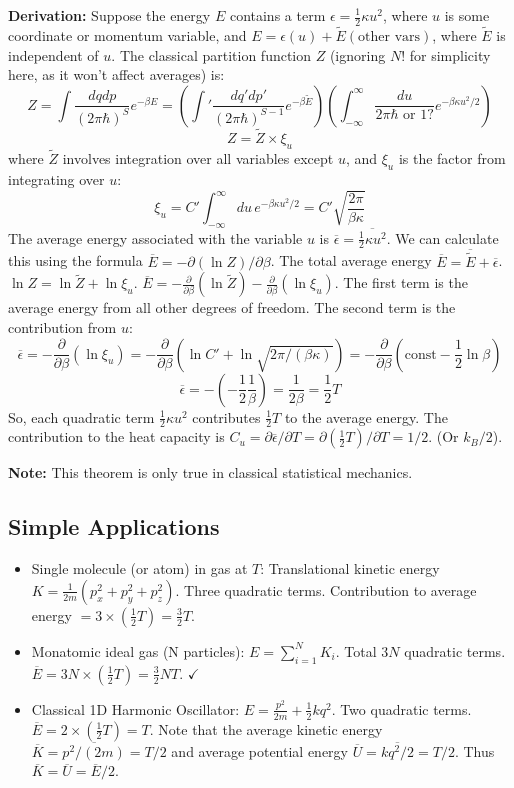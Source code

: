 \documentclass[11pt]{article}
\newcommand{\avg}[1]{\overline{#1}}
\newcommand{\pderiv}[2]{\frac{\partial #1}{\partial #2}}
\newcommand{\kb}{k_B} %
\begin{document}
\textbf{Derivation:} Suppose the energy $E$ contains a term $\epsilon = \frac{1}{2} \kappa u^2$, where $u$ is some coordinate or momentum variable, and $E = \epsilon(u) + \tilde{E}(\text{other vars})$, where $\tilde{E}$ is independent of $u$.
The classical partition function $Z$ (ignoring $N!$ for simplicity here, as it won't affect averages) is:
\[ Z = \int \frac{dq dp}{(2\pi\hbar)^S} e^{-\beta E} = \left( \int' \frac{dq' dp'}{(2\pi\hbar)^{S-1}} e^{-\beta \tilde{E}} \right) \left( \int_{-\infty}^{\infty} \frac{du}{2\pi\hbar \text{ or } 1?} e^{-\beta \kappa u^2 / 2} \right) \]
\[ Z = \tilde{Z} \times \xi_u \]
where $\tilde{Z}$ involves integration over all variables except $u$, and $\xi_u$ is the factor from integrating over $u$:
\[ \xi_u = C' \int_{-\infty}^{\infty} du \, e^{-\beta \kappa u^2 / 2} = C' \sqrt{\frac{2\pi}{\beta \kappa}} \]
The average energy associated with the variable $u$ is $\avg{\epsilon} = \avg{\frac{1}{2}\kappa u^2}$. We can calculate this using the formula $\avg{E} = -\partial (\ln Z)/\partial \beta$.
The total average energy $\avg{E} = \avg{\tilde{E}} + \avg{\epsilon}$.
$\ln Z = \ln \tilde{Z} + \ln \xi_u$.
$\avg{E} = -\pderiv{}{\beta}(\ln \tilde{Z}) - \pderiv{}{\beta}(\ln \xi_u)$.
The first term is the average energy from all other degrees of freedom. The second term is the contribution from $u$:
\[ \avg{\epsilon} = -\pderiv{}{\beta}(\ln \xi_u) = -\pderiv{}{\beta} (\ln C' + \ln \sqrt{2\pi/(\beta\kappa)}) = -\pderiv{}{\beta} (\text{const} - \frac{1}{2}\ln \beta) \]
\[ \avg{\epsilon} = - (-\frac{1}{2} \frac{1}{\beta}) = \frac{1}{2\beta} = \frac{1}{2} T \]
So, each quadratic term $\frac{1}{2}\kappa u^2$ contributes $\frac{1}{2}T$ to the average energy.
The contribution to the heat capacity is $C_u = \partial \avg{\epsilon} / \partial T = \partial (\frac{1}{2}T)/\partial T = 1/2$. (Or $\kb/2$).

\textbf{Note:} This theorem is only true in classical statistical mechanics.

\subsection*{Simple Applications}

\begin{itemize}
    \item Single molecule (or atom) in gas at $T$: Translational kinetic energy $K = \frac{1}{2m}(p_x^2 + p_y^2 + p_z^2)$. Three quadratic terms.
    Contribution to average energy $= 3 \times (\frac{1}{2}T) = \frac{3}{2}T$.
    \item Monatomic ideal gas (N particles): $E = \sum_{i=1}^N K_i$. Total $3N$ quadratic terms.
    $\avg{E} = 3N \times (\frac{1}{2}T) = \frac{3}{2} NT$. $\checkmark$
    \item Classical 1D Harmonic Oscillator: $E = \frac{p^2}{2m} + \frac{1}{2} k q^2$. Two quadratic terms.
    $\avg{E} = 2 \times (\frac{1}{2}T) = T$.
    Note that the average kinetic energy $\avg{K} = \avg{p^2/(2m)} = T/2$ and average potential energy $\avg{U} = \avg{kq^2/2} = T/2$. Thus $\avg{K} = \avg{U} = \avg{E}/2$.
\end{itemize}
\end{document}
